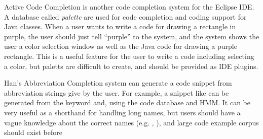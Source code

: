 \documentclass{sigchi}
\begin{document}
Active Code Completion\cite{Omar:2012:ACC:2337223.2337324}
is another code completion system for the Eclipse IDE.
A database called \textit{palette} are used for code completion and coding support
for Java classes.
When a user wants to write a code for drawing a rectangle in purple,
the user should just tell ``purple'' to the system,
and the system shows the user a color selection window
as well as the Java code for drawing a purple rectangle.
This is a useful feature for the user to write a code including selecting
a color, but paletts are difficult to create, and should be provided
as IDE plugins.

Han's Abbreviation Completion system\cite{Han:2009:CCA:1747491.1747530}
can generate a code snippet from abbreviation strings give by the user.
For example, a snippet like 
can be generated from the keyword
 and, using the code database and HMM.
It can be very useful as a shorthand for handling long names,
but users should have a vague knowledge about the correct names
(e.g. , ),
and large code example corpus should exist before

\end{document}
